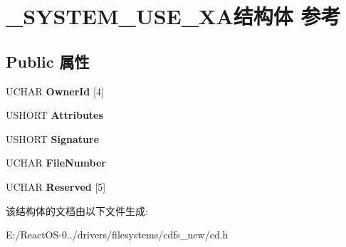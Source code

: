 \hypertarget{struct___s_y_s_t_e_m___u_s_e___x_a}{}\section{\+\_\+\+S\+Y\+S\+T\+E\+M\+\_\+\+U\+S\+E\+\_\+\+X\+A结构体 参考}
\label{struct___s_y_s_t_e_m___u_s_e___x_a}
\subsection*{Public 属性}
\begin{DoxyCompactItemize}
\item 
\mbox{\label{struct___s_y_s_t_e_m___u_s_e___x_a_a04af100c1a7e5903d310a99a77be2db6}} 
U\+C\+H\+AR {\bfseries Owner\+Id} \mbox{[}4\mbox{]}
\item 
\mbox{\label{struct___s_y_s_t_e_m___u_s_e___x_a_a40bcfdb094bf98c18ff583e039416494}} 
U\+S\+H\+O\+RT {\bfseries Attributes}
\item 
\mbox{\label{struct___s_y_s_t_e_m___u_s_e___x_a_afdda245fc7d380ca6d97b8f6605b9321}} 
U\+S\+H\+O\+RT {\bfseries Signature}
\item 
\mbox{\label{struct___s_y_s_t_e_m___u_s_e___x_a_a93df814591e63c7d90f0e50867f95885}} 
U\+C\+H\+AR {\bfseries File\+Number}
\item 
\mbox{\label{struct___s_y_s_t_e_m___u_s_e___x_a_aa7069ecaf29463346b2179e7212ab9ad}} 
U\+C\+H\+AR {\bfseries Reserved} \mbox{[}5\mbox{]}
\end{DoxyCompactItemize}


该结构体的文档由以下文件生成\+:\begin{DoxyCompactItemize}
\item 
E\+:/\+React\+O\+S-\/0../drivers/filesystems/cdfs\+\_\+new/cd.\+h\end{DoxyCompactItemize}
